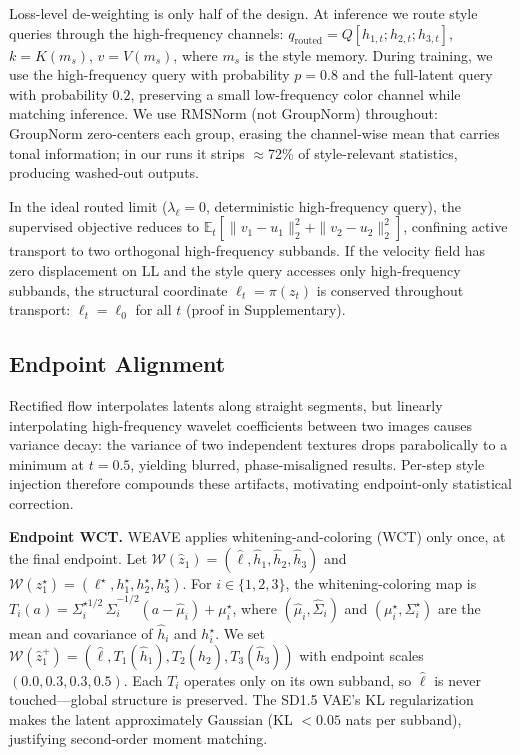 \documentclass[letterpaper]{article}
\begin{document}
Loss-level de-weighting is only half of the design.
At inference we route style queries through the high-frequency channels: $q_{\mathrm{routed}} = Q[h_{1,t};h_{2,t};h_{3,t}]$, $k = K(m_s)$, $v = V(m_s)$, where $m_s$ is the style memory.
During training, we use the high-frequency query with probability $p=0.8$ and the full-latent query with probability $0.2$, preserving a small low-frequency color channel while matching inference.
We use RMSNorm (not GroupNorm) throughout: GroupNorm zero-centers each group, erasing the channel-wise mean that carries tonal information; in our runs it strips $\approx$72\% of style-relevant statistics, producing washed-out outputs.

In the ideal routed limit ($\lambda_\ell=0$, deterministic high-frequency query), the supervised objective reduces to $\mathbb E_t[\|v_1-u_1\|_2^2 + \|v_2-u_2\|_2^2]$, confining active transport to two orthogonal high-frequency subbands.
If the velocity field has zero displacement on LL and the style query accesses only high-frequency subbands, the structural coordinate $\ell_t = \pi(z_t)$ is conserved throughout transport: $\ell_t = \ell_0$ for all $t$ (proof in Supplementary).

\subsection{Endpoint Alignment}
\label{sec:eota}

Rectified flow interpolates latents along straight segments, but linearly interpolating high-frequency wavelet coefficients between two images causes variance decay: the variance of two independent textures drops parabolically to a minimum at $t=0.5$, yielding blurred, phase-misaligned results.
Per-step style injection therefore compounds these artifacts, motivating endpoint-only statistical correction.

\textbf{Endpoint WCT.}
WEAVE applies whitening-and-coloring (WCT) only once, at the final endpoint.
Let $\mathcal W(\hat z_1) = (\hat \ell,\hat h_1,\hat h_2,\hat h_3)$ and $\mathcal W(z_1^\star) = (\ell^\star,h_1^\star,h_2^\star,h_3^\star)$.
For $i\in\{1,2,3\}$, the whitening-coloring map is $T_i(a) = \Sigma_i^{\star 1/2}\,\hat\Sigma_i^{-1/2}(a-\hat\mu_i)+\mu_i^\star$,
where $(\hat\mu_i,\hat\Sigma_i)$ and $(\mu_i^\star,\Sigma_i^\star)$ are the mean and covariance of $\hat h_i$ and $h_i^\star$.
We set $\mathcal W(\hat z_1^+) = (\hat \ell, T_1(\hat h_1), T_2(\hat h_2), T_3(\hat h_3))$ with endpoint scales $(0.0, 0.3, 0.3, 0.5)$.
Each $T_i$ operates only on its own subband, so $\hat \ell$ is never touched---global structure is preserved.
The SD1.5 VAE's KL regularization makes the latent approximately Gaussian (KL $<0.05$ nats per subband), justifying second-order moment matching.
\end{document}
